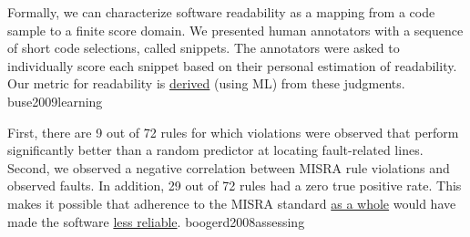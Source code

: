 \documentclass{article}
\begin{document}
  {Formally, we can characterize software readability as a mapping from a code sample to a finite score domain. We presented human annotators with a sequence of short code selections, called snippets. The annotators were asked to individually score each snippet based on their personal estimation of readability. Our metric for readability is \ul{derived} (using ML) from these judgments.}
  {buse2009learning}


  {First, there are 9 out of 72 rules for which violations were observed that perform significantly better than a random predictor at locating fault-related lines. Second, we observed a negative correlation between MISRA rule violations and observed faults. In addition, 29 out of 72 rules had a zero true positive rate. This makes it possible that adherence to the MISRA standard \ul{as a whole} would have made the software \ul{less reliable}.}
  {boogerd2008assessing}
\end{document}
